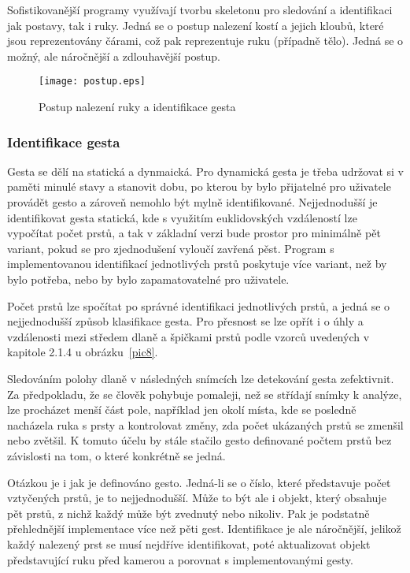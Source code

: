 Sofistikovanější programy využívají tvorbu skeletonu pro sledování a identifikaci jak postavy, tak i ruky. Jedná se o postup nalezení kostí a jejich kloubů, které jsou reprezentovány čárami, což pak reprezentuje ruku (případně tělo). Jedná se o možný, ale náročnější a zdlouhavější postup.

\begin{figure}[htp]
\centering
\texttt{[image: postup.eps]}
\caption{Postup nalezení ruky a identifikace gesta }
\label{picPostup}
\end{figure}

\subsubsection{Identifikace gesta}
Gesta se dělí na statická a dynmaická. Pro dynamická gesta je třeba udržovat si v paměti minulé stavy a stanovit dobu, po kterou by bylo přijatelné pro uživatele provádět gesto a zároveň  nemohlo být mylně identifikované. Nejjednodušší je identifikovat gesta statická, kde s využitím euklidovských vzdáleností lze vypočítat počet prstů, a tak v základní verzi bude prostor pro minimálně pět variant, pokud se pro zjednodušení vyloučí zavřená pěst. Program s implementovanou identifikací jednotlivých prstů poskytuje více variant, než by bylo potřeba, nebo by bylo zapamatovatelné pro uživatele.

Počet prstů lze spočítat po správné identifikaci jednotlivých prstů, a jedná se o nejjednodušší způsob klasifikace gesta. Pro přesnost se lze opřít i o úhly a vzdálenosti mezi středem dlaně a špičkami prstů podle vzorců uvedených v kapitole 2.1.4 u obrázku~\ref{pic8}.

Sledováním polohy dlaně v následných snímcích lze detekování gesta zefektivnit. Za předpokladu, že se člověk pohybuje pomaleji, než se střídají snímky k analýze, lze procházet menší část pole, například jen okolí místa, kde se posledně nacházela ruka s prsty a kontrolovat změny, zda počet ukázaných prstů se zmenšil nebo zvětšil. K tomuto účelu by stále stačilo gesto definované počtem prstů bez závislosti na tom, o které konkrétně se jedná.

Otázkou je i jak je definováno gesto. Jedná-li se o číslo, které představuje počet vztyčených prstů, je to nejjednodušší. Může to být ale i objekt, který obsahuje pět prstů, z nichž každý může být zvednutý nebo nikoliv. Pak je podstatně přehlednější implementace více než pěti gest. Identifikace je ale náročnější, jelikož každý nalezený prst se musí nejdříve identifikovat, poté aktualizovat objekt představující ruku před kamerou a porovnat s implementovanými gesty. 

